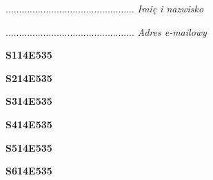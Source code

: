 \begin{turn}{90}\begin{minipage}{\linewidth} \vspace{20mm} ................................................  \textit{Imię i nazwisko}\end{minipage}\end{turn}

\begin{turn}{90}\begin{minipage}{\linewidth} \vspace{20mm} ................................................  \textit{Adres e-mailowy}\end{minipage}\end{turn}

\begin{turn}{90}\huge \begin{minipage}{\linewidth} \vspace{10mm}\textbf{S114E535}\end{minipage}\end{turn}

\begin{turn}{90}\huge \begin{minipage}{\linewidth} \vspace{10mm}\textbf{S214E535}\end{minipage}\end{turn}

\begin{turn}{90}\huge \begin{minipage}{\linewidth} \vspace{10mm}\textbf{S314E535}\end{minipage}\end{turn}

\begin{turn}{90}\huge \begin{minipage}{\linewidth} \vspace{10mm}\textbf{S414E535}\end{minipage}\end{turn}

\begin{turn}{90}\huge \begin{minipage}{\linewidth} \vspace{10mm}\textbf{S514E535}\end{minipage}\end{turn}

\begin{turn}{90}\huge \begin{minipage}{\linewidth} \vspace{10mm}\textbf{S614E535}\end{minipage}\end{turn}


